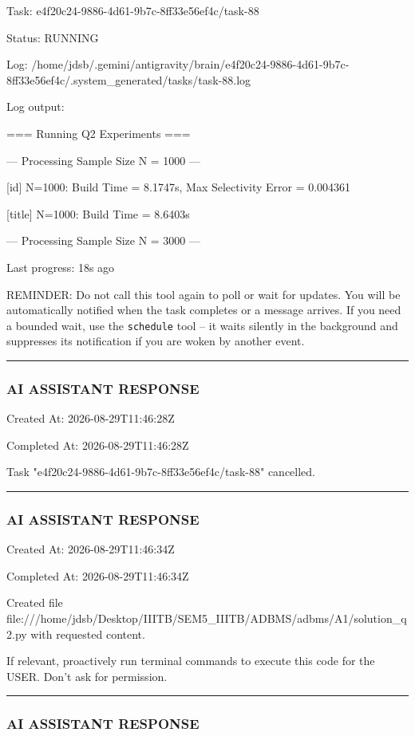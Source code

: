 \documentclass[11pt,a4paper]{article}
\begin{document}
{Task: e4f20c24-9886-4d61-9b7c-8ff33e56ef4c/task-88

Status: RUNNING

Log: /home/jdsb/.gemini/antigravity/brain/e4f20c24-9886-4d61-9b7c-8ff33e56ef4c/.system\_generated/tasks/task-88.log

Log output:

=== Running Q2 Experiments ===


--- Processing Sample Size N = 1000 ---

[id] N=1000: Build Time = 8.1747s, Max Selectivity Error = 0.004361

[title] N=1000: Build Time = 8.6403s


--- Processing Sample Size N = 3000 ---


Last progress: 18s ago



REMINDER: Do not call this tool again to poll or wait for updates. You will be automatically notified when the task completes or a message arrives. If you need a bounded wait, use the \texttt{schedule} tool -- it waits silently in the background and suppresses its notification if you are woken by another event.


\hrule

\subsubsection{AI ASSISTANT RESPONSE}

Created At: 2026-08-29T11:46:28Z

Completed At: 2026-08-29T11:46:28Z

Task "e4f20c24-9886-4d61-9b7c-8ff33e56ef4c/task-88" cancelled.


\hrule

\subsubsection{AI ASSISTANT RESPONSE}

Created At: 2026-08-29T11:46:34Z

Completed At: 2026-08-29T11:46:34Z

Created file file:///home/jdsb/Desktop/IIITB/SEM5\_IIITB/ADBMS/adbms/A1/solution\_q2.py with requested content.

If relevant, proactively run terminal commands to execute this code for the USER. Don't ask for permission.


\hrule

\subsubsection{AI ASSISTANT RESPONSE}

}
\end{document}
